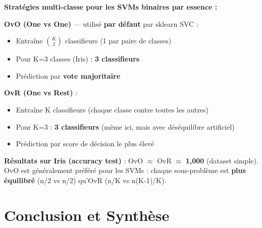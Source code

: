 \documentclass[12pt,a4paper]{article}
\begin{document}
\begin{reponsebox}
\textbf{Stratégies multi-classe pour les SVMs binaires par essence :}

\textbf{OvO (One vs One)} — utilisé \textbf{par défaut} par sklearn SVC :
\begin{itemize}[leftmargin=1.5em]
  \item Entraîne $\binom{K}{2}$ classifieurs (1 par paire de classes)
  \item Pour K=3 classes (Iris) : \textbf{3 classifieurs}
  \item Prédiction par \textbf{vote majoritaire}
\end{itemize}

\textbf{OvR (One vs Rest)} :
\begin{itemize}[leftmargin=1.5em]
  \item Entraîne K classifieurs (chaque classe contre toutes les autres)
  \item Pour K=3 : \textbf{3 classifieurs} (même ici, mais avec déséquilibre artificiel)
  \item Prédiction par score de décision le plus élevé
\end{itemize}

\textbf{Résultats sur Iris (accuracy test)} : OvO $\approx$ OvR $\approx$ \textbf{1{,}000} (dataset simple).
OvO est généralement préféré pour les SVMs : chaque sous-problème est \textbf{plus équilibré} (n/2 vs n/2) qu'OvR (n/K vs n(K-1)/K).
\end{reponsebox}

\section{Conclusion et Synthèse}
\end{document}
